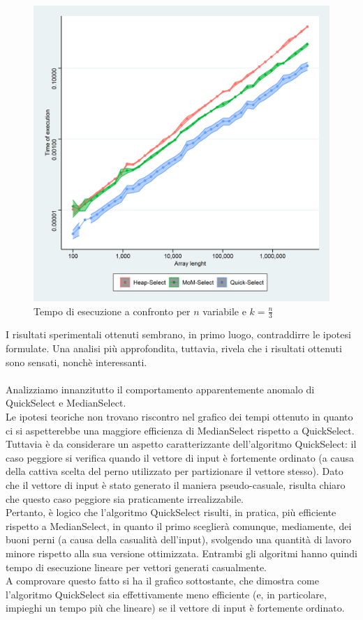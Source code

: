 \documentclass{article}
\begin{document}
	\begin{figure}[h!]
		\centering
  		\includegraphics[width=0.9	\columnwidth]{images/All_Basic_Times.png}
  		\caption{Tempo di esecuzione a confronto per $n$ variabile e $k=\frac{n}{3}$}
  		\label{fig:graph1}
	\end{figure}	
	
	I risultati sperimentali ottenuti sembrano, in primo luogo, contraddirre le ipotesi formulate. Una analisi più approfondita, tuttavia, rivela che i risultati ottenuti sono sensati, nonchè interessanti. 
	\\\\
	Analizziamo innanzitutto il comportamento apparentemente anomalo di QuickSelect e MedianSelect.
	\\
	Le ipotesi teoriche non trovano riscontro nel grafico dei tempi ottenuto in quanto ci si aspetterebbe una maggiore efficienza di MedianSelect rispetto a QuickSelect. Tuttavia è da considerare un aspetto caratterizzante dell'algoritmo QuickSelect: il caso peggiore si verifica quando il vettore di input è fortemente ordinato (a causa della cattiva scelta del perno utilizzato per partizionare il vettore stesso). Dato che il vettore di input è stato generato il maniera pseudo-casuale, risulta chiaro che questo caso peggiore sia praticamente irrealizzabile. 
	\\
	Pertanto, è logico che l'algoritmo QuickSelect risulti, in pratica, più efficiente rispetto a MedianSelect, in quanto il primo sceglierà comunque, mediamente, dei buoni perni (a causa della casualità dell'input), svolgendo una quantità di lavoro minore rispetto alla sua versione ottimizzata. Entrambi gli algoritmi hanno quindi tempo di esecuzione lineare per vettori generati casualmente. 
	\\ 
	A comprovare questo fatto si ha il grafico sottostante, che dimostra come l'algoritmo QuickSelect sia effettivamente meno efficiente (e, in particolare, impieghi un tempo più che lineare) se il vettore di input è fortemente ordinato.
	
\end{document}
